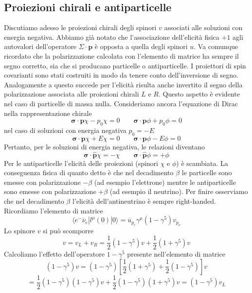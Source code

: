 \subsection{Proiezioni chirali e antiparticelle}
Discutiamo adesso le proiezioni chirali degli spinori $v$ associati alle soluzioni con energia negativa. Abbiamo già notato che l'associazione dell'elicità fisica $+1$ agli autovalori dell'operatore $\Sigma\cdot\mathbf{p}$ è opposta a quella degli spinori $u$. Va comunque ricordato che la polarizzazione calcolata con l'elemento di matrice ha sempre il segno corretto, sia che si producano particelle o antiparticelle. I proiettori di spin covarianti sono stati costruiti in modo da tenere conto dell'inversione di segno. Analogamente a questo succede per l'elicità risulta anche invertito il segno della polarizzazione associata alle proiezioni chirali $L$ e $R$. Questo aspetto è evidente nel caso di particelle di massa nulla. Consideriamo ancora l'equazione di Dirac nella rappresentazione chirale
$$
\boldsymbol{\sigma} \cdot \mathbf{p}\chi - p_0\chi = 0 \qquad \boldsymbol{\sigma} \cdot \mathbf{p}\phi + p_0\phi = 0
$$
nel caso di soluzioni con energia negativa $p_0=-E$
$$
\boldsymbol{\sigma} \cdot \mathbf{p}\chi + E\chi = 0 \qquad \boldsymbol{\sigma} \cdot \mathbf{p}\phi - E\phi = 0
$$
Pertanto, per le soluzioni di energia negativa, le relazioni diventano
$$
\boldsymbol{\sigma} \cdot \hat{\mathbf{p}}\chi = -\chi \qquad \boldsymbol{\sigma} \cdot \hat{\mathbf{p}}\phi = +\phi
$$
Per le antiparticelle l'elicità delle proiezioni (spinori $\chi$ e $\phi$) è scambiata. La conseguenza fisica di quanto detto è che nel decadimento $\beta$ le particelle sono emesse con polarizzazione $-\beta$ (ad esempio l'elettrone) mentre le antiparticelle sono emesse con polarizzazione $+\beta$ (ad esempio il neutrino). Per finire osserviamo che nel decadimento $\beta$ l'elicità dell'antineutrino è sempre right-handed. Ricordiamo l'elemento di matrice
$$
\langle e^- \overline{\nu}_e | l^\mu (0) | 0 \rangle = \overline{u}_{p_e} \gamma^\mu (1 - \gamma^5) v_{p_\nu}
$$
Lo spinore $v$ si può scomporre
$$
v = v_L + v_R = \frac{1}{2}(1 - \gamma^5)v + \frac{1}{2}(1 + \gamma^5)v
$$
Calcoliamo l'effetto dell'operatore $1-\gamma^5$ presente nell'elemento di matrice
$$
(1 - \gamma^5)v = (1 - \gamma^5) \left[ \frac{1}{2}(1 + \gamma^5) + \frac{1}{2}(1 - \gamma^5) \right] v
$$
$$
= \frac{1}{2}(1 - \gamma^5)(1 - \gamma^5)v + \frac{1}{2}(1 - \gamma^5)(1 + \gamma^5)v = (1 - \gamma^5)v_L
$$
